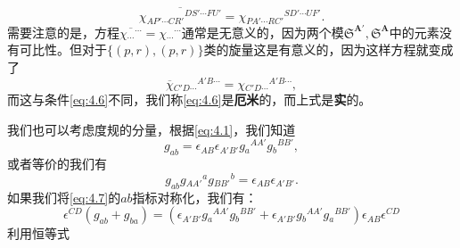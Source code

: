 \begin{equation}
	\overline{\chi {_{AP'\cdots CR'}}^{DS'\cdots FU'}} =\chi {_{PA'\cdots RC'}}^{SD'\cdots UF'} .
	\label{eq:4.6}
\end{equation}
需要注意的是，方程$\overline{\chi {_{\cdots }}^{\cdots }} =\chi {_{\cdots }}^{\cdots }$通常是无意义的，因为两个模$\mathfrak{S}^{\boldsymbol{A} '} ,\mathfrak{S}^{\boldsymbol{A}}$中的元素没有可比性。但对于$\{( p,r) ,( p,r)\}$类的旋量这是有意义的，因为这样方程就变成了
\begin{equation*}
	\overline{\chi }{_{C'D\cdots }}^{A'B\cdots } =\chi {_{C'D\cdots }}^{A'B\cdots } ,
\end{equation*}
而这与条件\ref{eq:4.6}不同，我们称\ref{eq:4.6}是\textbf{厄米}的，而上式是\textbf{实}的。



我们也可以考虑度规的分量，根据\ref{eq:4.1}，我们知道
\begin{equation}
	g_{ab} =\epsilon _{AB} \epsilon _{A'B'} g{_{a}}^{AA'} g{_{b}}^{BB'} ,
	\label{eq:4.7}
\end{equation}
或者等价的我们有
\begin{equation*}
	g_{ab} g{_{AA'}}^{a} g{_{BB'}}^{b} =\epsilon _{AB} \epsilon _{A'B'} .
\end{equation*}
如果我们将\ref{eq:4.7}的$ab$指标对称化，我们有：
\begin{equation*}
	\epsilon ^{CD} (g_{ab} +g_{ba} )=(\epsilon _{A'B'} g{_{a}}^{AA'} g{_{b}}^{BB'} +\epsilon _{A'B'} g{_{b}}^{AA'} g{_{a}}^{BB'} )\epsilon _{AB} \epsilon ^{CD}
\end{equation*}
利用恒等式

